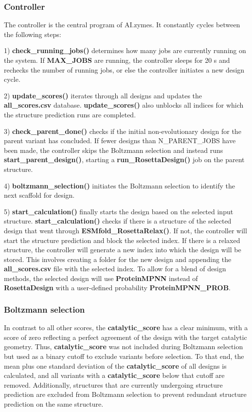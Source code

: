 \documentclass[10pt]{extarticle}
\begin{document}
\subsubsection{Controller}

The controller is the central program of AI.zymes. It constantly cycles between the following steps:

1)	\textbf{check\_running\_jobs()} determines how many jobs are currently running on the system. If \textbf{MAX\_JOBS} are running, the controller sleeps for 20 s and rechecks the number of running jobs, or else the controller initiates a new design cycle.

2)	\textbf{update\_scores()} iterates through all designs and updates the \textbf{all\_scores.csv} database. \textbf{update\_scores()} also unblocks all indices for which the structure prediction runs are completed. 

3)	\textbf{check\_parent\_done()} checks if the initial non-evolutionary design for the parent variant has concluded. If fewer designs than N\_PARENT\_JOBS have been made, the controller skips the Boltzmann selection and instead runs \textbf{start\_parent\_design()}, starting a \textbf{run\_RosettaDesign()} job on the parent structure.

4)	\textbf{boltzmann\_selection()} initiates the Boltzmann selection to identify the next scaffold for design.

5)	\textbf{start\_calculation()} finally starts the design based on the selected input structure. \textbf{start\_calculation()} checks if there is a structure of the selected design that went through \textbf{ESMfold\_RosettaRelax()}. If not, the controller will start the structure prediction and block the selected index. If there is a relaxed structure, the controller will generate a new index into which the design will be stored. This involves creating a folder for the new design and appending the \textbf{all\_scores.csv} file with the selected index. To allow for a blend of design methods, the selected design will use \textbf{ProteinMPNN} instead of \textbf{RosettaDesign} with a user-defined probability \textbf{ProteinMPNN\_PROB}.

\subsubsection{Boltzmann selection}

In contrast to all other scores, the \textbf{catalytic\_score} has a clear minimum, with a score of zero reflecting a perfect agreement of the design with the target catalytic geometry. Thus, \textbf{catalytic\_score} was not included during Boltzmann selection but used as a binary cutoff to exclude variants before selection. To that end, the mean plus one standard deviation of the \textbf{catalytic\_score} of all designs is calculated, and all variants with a \textbf{catalytic\_score} below that cutoff are removed. Additionally, structures that are currently undergoing structure prediction are excluded from Boltzmann selection to prevent redundant structure prediction on the same structure.
\end{document}
